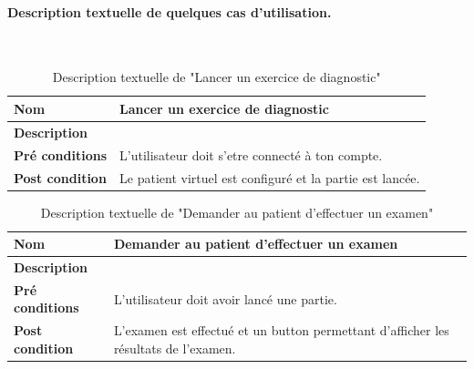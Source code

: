     \paragraph{Description textuelle de quelques cas d'utilisation.} \hfill \\
    
    \begin{table}[H]
        \centering
        \begin{tabular}{|p{}|p{}|}
            \hline
            \textbf{Nom} &  Lancer un exercice de diagnostic\\
            \hline
            \textbf{Description}& \\ 
            \hline
            \textbf{Pré conditions}& L'utilisateur doit s'etre connecté à ton compte.\\ 
            \hline
            \textbf{Post condition}& Le patient virtuel est configuré et la partie est lancée.\\ 
            \hline
        \end{tabular}
        
        \captionsetup{justification=centering}
        \caption{Description textuelle de "Lancer un exercice de diagnostic"}
        \label{tab:exercice_use_case}
    \end{table}
    
    \begin{table}[H]
        \centering
        \begin{tabular}{|p{}|p{}|}
            \hline
            \textbf{Nom} & Demander au patient d'effectuer un examen\\
            \hline
            \textbf{Description}& \\ 
            \hline
            \textbf{Pré conditions}& L'utilisateur doit avoir lancé une partie.\\ 
            \hline
            \textbf{Post condition}& L'examen est effectué et un button permettant d'afficher les résultats de l'examen.\\
            \hline
        \end{tabular}
        
        \captionsetup{justification=centering}
        \caption{Description textuelle de "Demander au patient d'effectuer un examen"}
        \label{tab:examen_use_case}
        
    \end{table}
    
